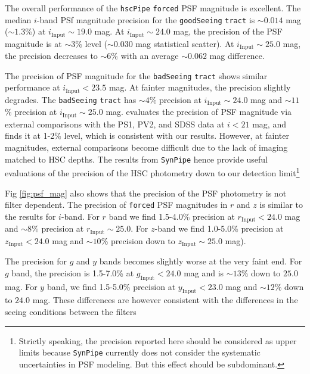 \documentclass[useamsfonts]{pasj01}
\def\hscpipe{\texttt{hscPipe}}
\def\synpipe{\texttt{SynPipe}}
\def\forced{\texttt{forced}}
\def\tract{\texttt{tract}}
\begin{document}
    The overall performance of the \hscpipe{} \forced{} PSF magnitude is excellent. 
    The median $i$-band PSf magnitude precision for the \texttt{goodSeeing} \tract{} 
    is ${\sim}0.014$ mag (${\sim}1.3$\%) at $i_{\mathrm{Input}}{\sim}19.0$ mag. 
    At $i_{\mathrm{Input}}{\sim}24.0$ mag, the precision of the PSF magnitude is 
    at ${\sim}3$\% level (${\sim}0.030$ mag statistical scatter).
    At $i_{\mathrm{Input}}{\sim}25.0$ mag, the precision decreases to
    ${\sim}6$\% with an average ${\sim}0.062$ mag difference.
    
    The precision of PSF magnitude for the \texttt{badSeeing} \tract{} shows similar 
    performance at $i_{\mathrm{Input}}<23.5$ mag. 
    At fainter magnitudes, the precision slightly degrades. 
    The \texttt{badSeeing} \tract{} has ${\sim}4$\% precision at
    $i_{\mathrm{Input}}{\sim}24.0$ mag and ${\sim}11$\% precision at
    $i_{\mathrm{Input}}{\sim}25.0$ mag.
    \citet{HSCDR1} evaluates the precision of PSF magnitude via external comparisons
    with the PS1, PV2, and SDSS data at $i<21$ mag, and finds it at 1-2\% level,
    which is consistent with our results. 
    However, at fainter magnitudes, external comparisons become difficult due to the 
    lack of imaging matched to HSC depths.
    The results from \synpipe{} hence provide useful evaluations of the precision of 
    the HSC photometry down to our detection limit\footnote{Strictly speaking, the 
    precision reported here should be considered as upper limits because 
    \synpipe{} currently does not consider the systematic uncertainties in PSF 
    modeling. But this effect should be subdominant.}

    Fig \ref{fig:psf_mag} also shows that the precision of the PSF photometry is 
    not filter dependent. 
    The precision of \forced{} PSF magnitudes in $r$ and $z$ is similar to the results
    for $i$-band. 
    For $r$ band we find 1.5-4.0\% precision at $r_{\mathrm{Input}} < 24.0$ mag and 
    ${\sim}8$\% precision at $r_{\mathrm{Input}}{\sim}25.0$. 
    For $z$-band we find 1.0-5.0\% precision at $z_{\mathrm{Input}} < 24.0$ mag and 
    ${\sim}10$\% precision down to $z_{\mathrm{Input}}{\sim}25.0$ mag).
    
    The precision for $g$ and $y$ bands becomes slightly worse at the very faint end. 
    For $g$ band, the precision is 1.5-7.0\% at $g_{\mathrm{Input}} < 24.0$ mag and is
    ${\sim}13$\% down to $25.0$ mag.
    For $y$ band, we find 1.5-5.0\% precision at $y_{\mathrm{Input}} < 23.0$ mag and
    ${\sim}12$\% down to $24.0$ mag. 
    These differences are however consistent with the differences in the seeing 
    conditions between the filters 
    
\end{document}

